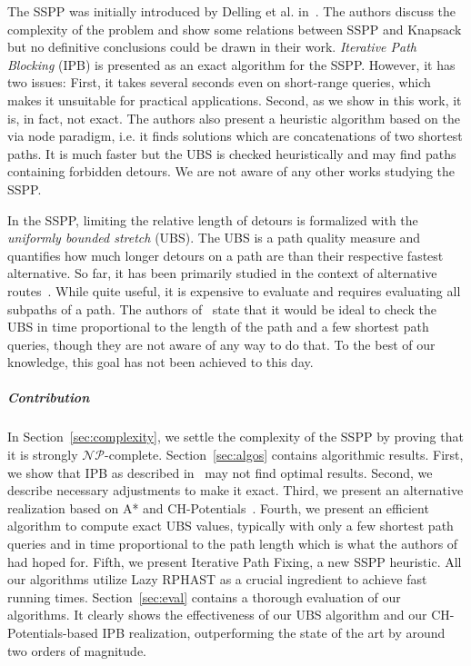 \documentclass[a4paper,UKenglish,cleveref, autoref, thm-restate]{lipics-v2021}
\begin{document}
The SSPP was initially introduced by Delling et al. in~\cite{dss-tarrn-18}.
The authors discuss the complexity of the problem and show some relations between SSPP and Knapsack but no definitive conclusions could be drawn in their work.
\emph{Iterative Path Blocking} (IPB) is presented as an exact algorithm for the SSPP.
However, it has two issues:
First, it takes several seconds even on short-range queries, which makes it unsuitable for practical applications.
Second, as we show in this work, it is, in fact, not exact.
The authors also present a heuristic algorithm based on the via node paradigm, i.e. it finds solutions which are concatenations of two shortest paths.
It is much faster but the UBS is checked heuristically and may find paths containing forbidden detours.
We are not aware of any other works studying the SSPP.

In the SSPP, limiting the relative length of detours is formalized with the \emph{uniformly bounded stretch} (UBS).
The UBS is a path quality measure and quantifies how much longer detours on a path are than their respective fastest alternative.
So far, it has been primarily studied in the context of alternative routes~\cite{adgw-arrn-13}.
While quite useful, it is expensive to evaluate and requires evaluating all subpaths of a path.
The authors of~\cite{adgw-arrn-13} state that it would be ideal to check the UBS in time proportional to the length of the path and a few shortest path queries, though they are not aware of any way to do that.
To the best of our knowledge, this goal has not been achieved to this day.

\subparagraph{Contribution}

In Section~\ref{sec:complexity}, we settle the complexity of the SSPP by proving that it is strongly $\mathcal{NP}$-complete.
Section~\ref{sec:algos} contains algorithmic results.
First, we show that IPB as described in~\cite{dss-tarrn-18} may not find optimal results.
Second, we describe necessary adjustments to make it exact.
Third, we present an alternative realization based on A* and CH-Potentials~\cite{strasser_et_al:LIPIcs.SEA.2021.6}.
Fourth, we present an efficient algorithm to compute exact UBS values, typically with only a few shortest path queries and in time proportional to the path length which is what the authors of~\cite{adgw-arrn-13} had hoped for.
Fifth, we present Iterative Path Fixing, a new SSPP heuristic.
All our algorithms utilize Lazy RPHAST as a crucial ingredient to achieve fast running times.
Section~\ref{sec:eval} contains a thorough evaluation of our algorithms.
It clearly shows the effectiveness of our UBS algorithm and our CH-Potentials-based IPB realization, outperforming the state of the art by around two orders of magnitude.
\end{document}
